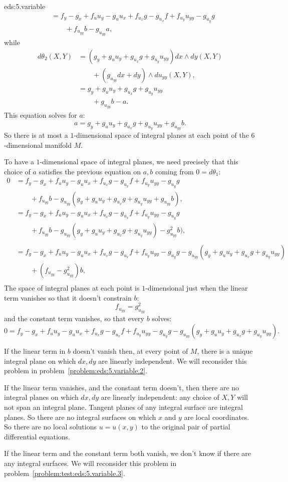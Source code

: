 \begin{answer}{eds:5.variable}
\begin{align*}
&=
f_y-g_x+f_u u_y-g_u u_x
+f_{u_x}g-g_{u_x}f
+f_{u_y}u_{yy}-g_{u_y}g
\\
&\qquad+
f_{u_{yy}}b -g_{u_{yy}}a,
\end{align*}
while
\begin{align*}
d\theta_2(X,Y)
&=
(g_y+g_u u_y + g_{u_x} g + g_{u_y} u_{yy}) dx\wedge dy(X,Y)
\\
&\qquad
+(g_{u_{yy}} dx+dy)\wedge du_{yy}(X,Y),
\\
&=g_y+g_u u_y + g_{u_x} g + g_{u_y} u_{yy} 
\\
&\qquad
+
g_{u_{yy}}b-a.
\end{align*}
This equation solves for \(a\):
\[
a=g_y+g_u u_y + g_{u_x} g + g_{u_y} u_{yy}+g_{u_{yy}}b.
\]
So there is at most a \(1\)-dimensional space of integral planes at each point of the \(6\)-dimensional manifold \(M\).

To have a \(1\)-dimensional space of integral planes, we need precisely that this choice of \(a\) satisfies the previous equation on \(a,b\) coming from \(0=d\theta_1\):
\begin{align*}
0&=
f_y-g_x+f_u u_y-g_u u_x
+f_{u_x}g-g_{u_x}f
+f_{u_y}u_{yy}-g_{u_y}g
\\
&\qquad+
f_{u_{yy}}b -g_{u_{yy}}(g_y+g_u u_y + g_{u_x} g + g_{u_y} u_{yy}+g_{u_{yy}}b),\\
&=
f_y-g_x+f_u u_y-g_u u_x
+f_{u_x}g-g_{u_x}f
+f_{u_y}u_{yy}-g_{u_y}g
\\
&\qquad+
f_{u_{yy}}b 
-g_{u_{yy}}(g_y+g_u u_y + g_{u_x} g + g_{u_y} u_{yy})
-g^2_{u_{yy}}b),\\
\\
&=
f_y-g_x+f_u u_y-g_u u_x
+f_{u_x}g-g_{u_x}f
+f_{u_y}u_{yy}-g_{u_y}g
-g_{u_{yy}}(g_y+g_u u_y + g_{u_x} g + g_{u_y} u_{yy})
\\
&\qquad+
(f_{u_{yy}}
-g_{u_{yy}}^2)b,\\
\end{align*}
The space of integral planes at each point is \(1\)-dimensional just when the linear term vanishes so that it doesn't constrain \(b\):
\[
f_{u_{yy}}
=g^2_{u_{yy}}
\]
and the constant term vanishes, so that every \(b\) solves:
\[
0=
f_y-g_x+f_u u_y-g_u u_x
+f_{u_x}g-g_{u_x}f
+f_{u_y}u_{yy}-g_{u_y}g
-g_{u_{yy}}(g_y+g_u u_y + g_{u_x} g + g_{u_y} u_{yy}).
\]

If the linear term in \(b\) doesn't vanish then, at every point of \(M\), there is a unique integral plane on which \(dx,dy\) are linearly independent.
We will reconsider this problem in problem~\vref{problem:eds:5.variable.2}.

If the linear term vanishes, and the constant term doesn't, then there are no integral planes on which \(dx,dy\) are linearly independent: any choice of \(X,Y\) will not span an integral plane.
Tangent planes of any integral surface are integral planes.
So there are no integral surfaces on which \(x\) and \(y\) are local coordinates.
So there are no local solutions \(u=u(x,y)\) to the original pair of partial differential equations.

If the linear term and the constant term both vanish, we don't know if there are any integral surfaces.
We will reconsider this problem in problem~\vref{problem:test:eds:5.variable.3}.
\end{answer}
